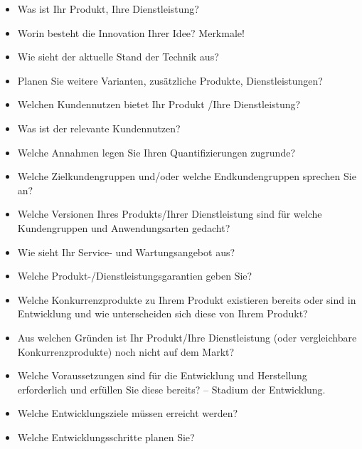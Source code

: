 \begin{itemize}
\item Was ist Ihr Produkt, Ihre Dienstleistung?
\item Worin besteht die Innovation Ihrer Idee? Merkmale!
\item Wie sieht der aktuelle Stand der Technik aus?
\item Planen Sie weitere Varianten, zusätzliche Produkte, Dienstleistungen?
\item Welchen Kundennutzen bietet Ihr Produkt /Ihre Dienstleistung?
\item Was ist der relevante Kundennutzen?
\item Welche Annahmen legen Sie Ihren Quantifizierungen zugrunde?
\item Welche Zielkundengruppen und/oder welche Endkundengruppen sprechen Sie an?
\item Welche Versionen Ihres Produkts/Ihrer Dienstleistung sind für welche Kundengruppen und Anwendungsarten gedacht?
\item Wie sieht Ihr Service- und Wartungsangebot aus?
\item Welche Produkt-/Dienstleistungsgarantien geben Sie?
\item Welche Konkurrenzprodukte zu Ihrem Produkt existieren bereits oder sind in Entwicklung und wie unterscheiden sich diese von Ihrem Produkt?
\item Aus welchen Gründen ist Ihr Produkt/Ihre Dienstleistung (oder vergleichbare Konkurrenzprodukte) noch nicht auf dem Markt?
\item Welche Voraussetzungen sind für die Entwicklung und Herstellung erforderlich und erfüllen Sie diese bereits? – Stadium der Entwicklung.
\item Welche Entwicklungsziele müssen erreicht werden? 
\item Welche Entwicklungsschritte planen Sie?
\end{itemize}